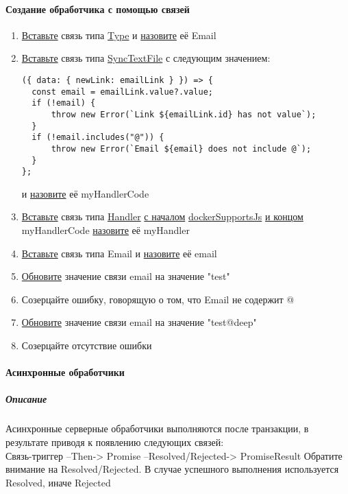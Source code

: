 \paragraph{Создание обработчика с помощью связей}
\begin{enumerate}
  \item \hyperlink{DeepCase.InsertLink.Description}{Вставьте} связь типа
        \hyperlink{Core.Type.Description}{Type} и
        \hyperlink{FAQ.HowToSetName}{назовите} её Email
  \item \hyperlink{DeepCase.InsertLink.Description}{Вставьте} связь типа
        \hyperlink{Core.SyncTextFile.Description}{SyncTextFile} с следующим
        значением:
        \begin{lstlisting}
({ data: { newLink: emailLink } }) => {
  const email = emailLink.value?.value;
  if (!email) {
      throw new Error(`Link ${emailLink.id} has not value`);
  }
  if (!email.includes("@")) {
      throw new Error(`Email ${email} does not include @`);
  }
};
            \end{lstlisting}
        и \hyperlink{FAQ.HowToSetName}{назовите} её myHandlerCode
  \item \hyperlink{DeepCase.InsertLink.Description}{Вставьте} связь типа
        \hyperlink{Core.Handler.Description}{Handler}
        \hyperlink{FAQ.HowToInsertLinkWithFromAndTo}{с началом}
        \hyperlink{Core.plv8SupportsJs.Description}{dockerSupportsJs}
        \hyperlink{FAQ.HowToInsertLinkWithFromAndTo}{и
          концом}
        myHandlerCode \hyperlink{FAQ.HowToSetName}{назовите} её myHandler
  \item \hyperlink{DeepCase.InsertLink.Description}{Вставьте} связь типа
        Email и \hyperlink{FAQ.HowToSetName}{назовите} её email
  \item \hyperlink{DeepCase.UpdateLink.Description}{Обновите} значение
        связи email на значение "test"
  \item Созерцайте ошибку, говорящую о том, что Email не содержит @
  \item \hyperlink{DeepCase.UpdateLink.Description}{Обновите} значение
        связи email на значение "test@deep"
  \item Созерцайте отсутствие ошибки
\end{enumerate}

\paragraph{Асинхронные обработчики}
\subparagraph{Описание}
Асинхронные серверные обработчики выполняются после транзакции, в результате
приводя к появлению следующих связей: \\
\hypertarget{Handlers.Async.Result}{}Связь-триггер --Then-> Promise
--Resolved/Rejected-> PromiseResult
Обратите внимание на Resolved/Rejected. В случае успешного выполнения
используется Resolved, иначе Rejected

